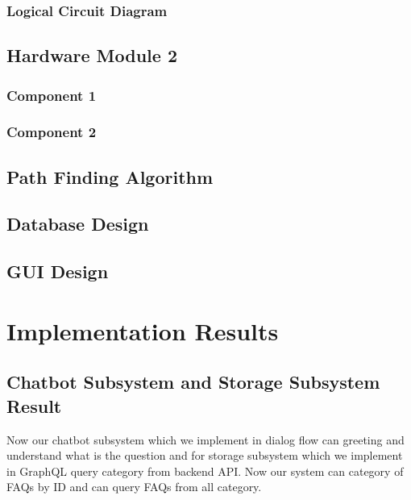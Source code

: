 \documentclass[12pt,oneside,openright,a4paper]{cpe-english-project}
\begin{document}
\subsection{Logical Circuit Diagram}

\section{Hardware Module 2}
\subsection{Component 1}
\subsection{Component 2}

\section{Path Finding Algorithm}

\section{Database Design}

\section{GUI Design}



\chapter{Implementation Results}
\section{Chatbot Subsystem and Storage Subsystem Result}
Now our chatbot subsystem which we implement in dialog flow can greeting and understand what is the question and for storage subsystem which we implement in GraphQL query category from backend API. Now our system can category of FAQs by ID and can query FAQs from all category.
\end{document}
